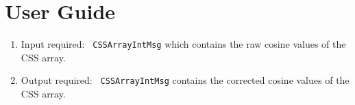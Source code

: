 
\section{User Guide}
\begin{enumerate}
\item Input required: \verb~ CSSArrayIntMsg~ which contains the raw cosine values of the CSS array.
\item Output required: \verb~ CSSArrayIntMsg~ contains the corrected cosine values of the CSS array. 
\end{enumerate}
